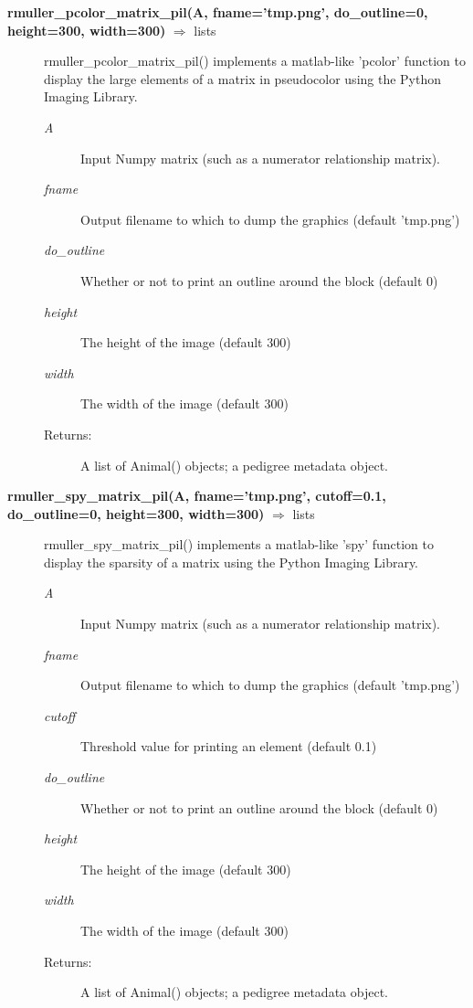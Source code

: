 \begin{description}
\item[\textbf{rmuller\_pcolor\_matrix\_pil(A, fname='tmp.png', do\_outline=0, height=300, width=300)} $\Rightarrow$ lists]
rmuller\_pcolor\_matrix\_pil() implements a matlab-like 'pcolor' function to display the large elements of a matrix in pseudocolor using the Python Imaging Library.
\begin{description}
\item[\emph{A}] Input Numpy matrix (such as a numerator relationship matrix).
\item[\emph{fname}] Output filename to which to dump the graphics (default 'tmp.png')
\item[\emph{do\_outline}] Whether or not to print an outline around the block (default 0)
\item[\emph{height}] The height of the image (default 300)
\item[\emph{width}] The width of the image (default 300)
\item[Returns:] A list of Animal() objects; a pedigree metadata object.
\end{description}

\item[\textbf{rmuller\_spy\_matrix\_pil(A, fname='tmp.png', cutoff=0.1, do\_outline=0, height=300, width=300)} $\Rightarrow$ lists]
rmuller\_spy\_matrix\_pil() implements a matlab-like 'spy' function to display the sparsity of a matrix using the Python Imaging Library.
\begin{description}
\item[\emph{A}] Input Numpy matrix (such as a numerator relationship matrix).
\item[\emph{fname}] Output filename to which to dump the graphics (default 'tmp.png')
\item[\emph{cutoff}] Threshold value for printing an element (default 0.1)
\item[\emph{do\_outline}] Whether or not to print an outline around the block (default 0)
\item[\emph{height}] The height of the image (default 300)
\item[\emph{width}] The width of the image (default 300)
\item[Returns:] A list of Animal() objects; a pedigree metadata object.
\end{description}


\end{description}
